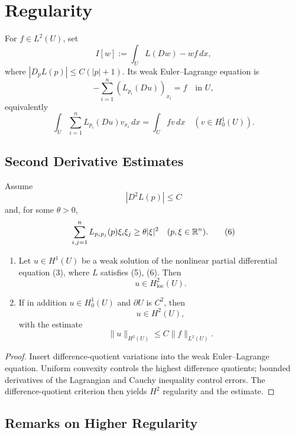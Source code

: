 \section{Regularity}
\label{sec:regularity-calculus-of-variations}

For $f\in L^2(U)$, set
\[
I[w]:=\int_U L(Dw)-wf\,dx,
\tag{1}
\]
where $|D_pL(p)|\leq C(|p|+1)$. Its weak Euler--Lagrange equation is
\[
-\sum_{i=1}^n(L_{p_i}(Du))_{x_i}=f\quad\text{in }U,
\tag{3}
\]
equivalently
\[
\int_U\sum_{i=1}^nL_{p_i}(Du)v_{x_i}\,dx=\int_Ufv\,dx
\quad(v\in H_0^1(U)).
\tag{4}
\]

\subsection{Second Derivative Estimates}
\label{sec:second-derivative-estimates-calculus-of-variations}

Assume
\[
|D^2L(p)|\leq C
\tag{5}
\]
and, for some $\theta>0$,
\[
\sum_{i,j=1}^nL_{p_ip_j}(p)\xi_i\xi_j\geq\theta|\xi|^2
\quad(p,\xi\in\mathbb{R}^n).
\tag{6}
\]

\begin{theorem}
\label{thm:second-derivatives-minimizers}

\begin{enumerate}
\item[(i)] Let $u \in H^1(U)$ be a weak solution of the nonlinear partial differential equation (3), where $L$ satisfies (5), (6). Then
\[
u \in H^2_{\mathrm{loc}}(U).
\]
\item[(ii)] If in addition $u \in H_0^1(U)$ and $\partial U$ is $C^2$, then
\[
u \in H^2(U),
\]
with the estimate
\[
\|u\|_{H^2(U)} \le C\|f\|_{L^2(U)}.
\]
\end{enumerate}
\end{theorem}

\begin{proof}
\sketch Insert difference-quotient variations into the weak Euler--Lagrange equation. Uniform convexity controls the highest difference quotients; bounded derivatives of the Lagrangian and Cauchy inequality control errors. The difference-quotient criterion then yields $H^2$ regularity and the estimate.
\end{proof}

\subsection{Remarks on Higher Regularity}
\label{sec:higher-regularity-remarks}

